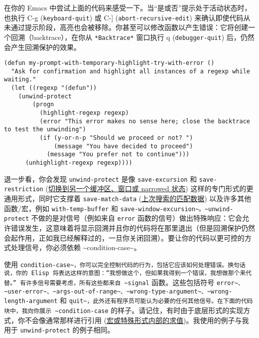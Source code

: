 \documentclass[11pt]{ctexart}
\begin{document}
在你的 Emacs 中尝试上面的代码来感受一下。当“是或否”提示处于活动状态时，也执行 C-g (\texttt{keyboard-quit}) 或 C-] (\texttt{abort-recursive-edit}) 来确认即使代码从未通过提示阶段，高亮也会被移除。你甚至可以修改函数以产生错误：它将创建一个回溯（backtrace），在你从 \texttt{*Backtrace*} 窗口执行 q (\texttt{debugger-quit}) 后，仍然会产生回溯保护的效果。

\begin{verbatim}
(defun my-prompt-with-temporary-highlight-try-with-error ()
  "Ask for confirmation and highlight all instances of a regexp while waiting."
  (let ((regexp "(defun"))
    (unwind-protect
        (progn
          (highlight-regexp regexp)
          (error "This error makes no sense here; close the backtrace to test the unwinding")
          (if (y-or-n-p "Should we proceed or not? ")
              (message "You have decided to proceed")
            (message "You prefer not to continue")))
      (unhighlight-regexp regexp))))
\end{verbatim}

退一步看，你会发现 \texttt{unwind-protect} 是像 \texttt{save-excursion} 和 \texttt{save-restriction} (\hyperref[sec:org943a740]{切换到另一个缓冲区、窗口或 narrowed 状态}) 这样的专门形式的更通用形式，同时它支撑着 \texttt{save-match-data} (\hyperref[sec:org5d051bd]{上次搜索的匹配数据}) 以及许多其他函数/宏，例如 \texttt{with-temp-buffer} 和 \texttt{save-window-excursion\textasciitilde{}。\textasciitilde{}unwind-protect} 不做的是对信号（例如来自 \texttt{error} 函数的信号）做出特殊响应：它会允许错误发生，这意味着将显示回溯并且你的代码将在那里退出（但是回溯保护仍然会起作用，正如我已经解释过的，一旦你关闭回溯）。要让你的代码以更可控的方式处理信号，你必须依赖 \textasciitilde{}condition-case\textasciitilde{}。

使用 \texttt{condition-case\textasciitilde{}，你可以完全控制代码的行为，包括它应该如何处理错误。换句话说，你的 Elisp 将表达这样的意图：“我想做这个，但如果我得到一个错误，我想做那个来代替。” 有许多信号需要考虑，所有这些都来自 \textasciitilde{}signal} 函数。这些包括符号 \texttt{error\textasciitilde{}、\textasciitilde{}user-error\textasciitilde{}、\textasciitilde{}args-out-of-range\textasciitilde{}、\textasciitilde{}wrong-type-argument\textasciitilde{}、\textasciitilde{}wrong-length-argument} 和 \texttt{quit\textasciitilde{}，此外还有程序员可能认为必要的任何其他信号。在下面的代码块中，我向你展示 \textasciitilde{}condition-case} 的样子。请记住，有时由于底层形式的实现方式，你不会像通常那样进行引用 (\hyperref[sec:org6bfc8f0]{宏或特殊形式内部的求值})。我使用的例子与我用于 \texttt{unwind-protect} 的例子相同。
\end{document}
